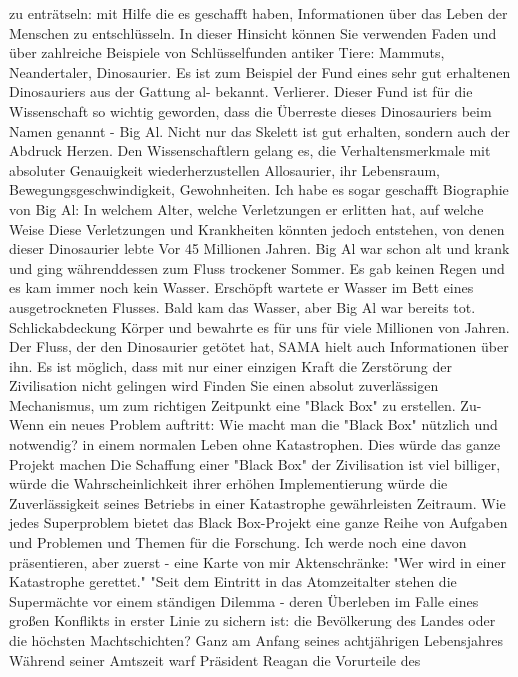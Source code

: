 \documentclass[11pt,a4paper]{article}
\begin{document}
zu enträtseln: mit Hilfe die es geschafft haben, Informationen über das Leben
der Menschen zu entschlüsseln. In dieser Hinsicht können Sie verwenden Faden
und über zahlreiche Beispiele von Schlüsselfunden antiker Tiere: Mammuts,
Neandertaler, Dinosaurier.  Es ist zum Beispiel der Fund eines sehr gut
erhaltenen Dinosauriers aus der Gattung al- bekannt.  Verlierer. Dieser Fund
ist für die Wissenschaft so wichtig geworden, dass die Überreste dieses
Dinosauriers beim Namen genannt - Big Al. Nicht nur das Skelett ist gut
erhalten, sondern auch der Abdruck Herzen. Den Wissenschaftlern gelang es, die
Verhaltensmerkmale mit absoluter Genauigkeit wiederherzustellen Allosaurier,
ihr Lebensraum, Bewegungsgeschwindigkeit, Gewohnheiten. Ich habe es sogar
geschafft Biographie von Big Al: In welchem ​​Alter, welche Verletzungen er
erlitten hat, auf welche Weise Diese Verletzungen und Krankheiten könnten
jedoch entstehen, von denen dieser Dinosaurier lebte Vor 45 Millionen
Jahren. Big Al war schon alt und krank und ging währenddessen zum Fluss
trockener Sommer. Es gab keinen Regen und es kam immer noch kein
Wasser. Erschöpft wartete er Wasser im Bett eines ausgetrockneten
Flusses. Bald kam das Wasser, aber Big Al war bereits tot. Schlickabdeckung
Körper und bewahrte es für uns für viele Millionen von Jahren. Der Fluss, der
den Dinosaurier getötet hat, SAMA hielt auch Informationen über ihn.  Es ist
möglich, dass mit nur einer einzigen Kraft die Zerstörung der Zivilisation
nicht gelingen wird Finden Sie einen absolut zuverlässigen Mechanismus, um zum
richtigen Zeitpunkt eine "Black Box" zu erstellen. Zu- Wenn ein neues Problem
auftritt: Wie macht man die "Black Box" nützlich und notwendig?  in einem
normalen Leben ohne Katastrophen. Dies würde das ganze Projekt machen Die
Schaffung einer "Black Box" der Zivilisation ist viel billiger, würde die
Wahrscheinlichkeit ihrer erhöhen Implementierung würde die Zuverlässigkeit
seines Betriebs in einer Katastrophe gewährleisten Zeitraum.  Wie jedes
Superproblem bietet das Black Box-Projekt eine ganze Reihe von Aufgaben und
Problemen und Themen für die Forschung. Ich werde noch eine davon
präsentieren, aber zuerst - eine Karte von mir Aktenschränke: "Wer wird in
einer Katastrophe gerettet."  "Seit dem Eintritt in das Atomzeitalter stehen
die Supermächte vor einem ständigen Dilemma - deren Überleben im Falle eines
großen Konflikts in erster Linie zu sichern ist: die Bevölkerung des Landes
oder die höchsten Machtschichten? Ganz am Anfang seines achtjährigen
Lebensjahres Während seiner Amtszeit warf Präsident Reagan die Vorurteile des
\end{document}
